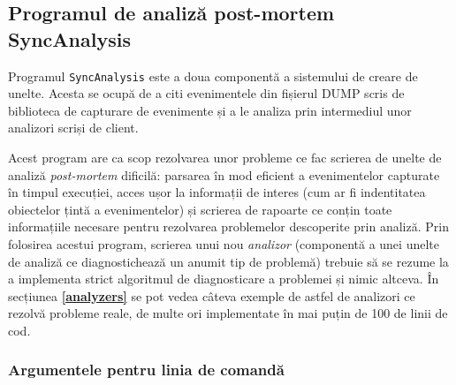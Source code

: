 \subsection{Programul de analiză post-mortem SyncAnalysis}
\label{executable}

Programul \lstinline{SyncAnalysis} este a doua componentă a sistemului
de creare de unelte. Acesta se ocupă de a citi evenimentele din fișierul
DUMP scris de biblioteca de capturare de evenimente și a le analiza prin
intermediul unor analizori scriși de client.

Acest program are ca scop rezolvarea unor probleme ce fac scrierea de
unelte de analiză \textit{post-mortem} dificilă: parsarea în mod
eficient a evenimentelor capturate în timpul execuției, acces ușor la
informații de interes (cum ar fi indentitatea obiectelor țintă a
evenimentelor) și scrierea de rapoarte ce conțin toate informațiile
necesare pentru rezolvarea problemelor descoperite prin analiză. Prin
folosirea acestui program, scrierea unui nou \textit{analizor}
(componentă a unei unelte de analiză ce diagnostichează un anumit tip de
problemă) trebuie să se rezume la a implementa strict algoritmul de
diagnosticare a problemei și nimic altceva. În secțiunea
\textbf{\ref{analyzers}} se pot vedea câteva exemple de astfel de
analizori ce rezolvă probleme reale, de multe ori implementate în mai
puțin de 100 de linii de cod.

\subsubsection{Argumentele pentru linia de comandă}

